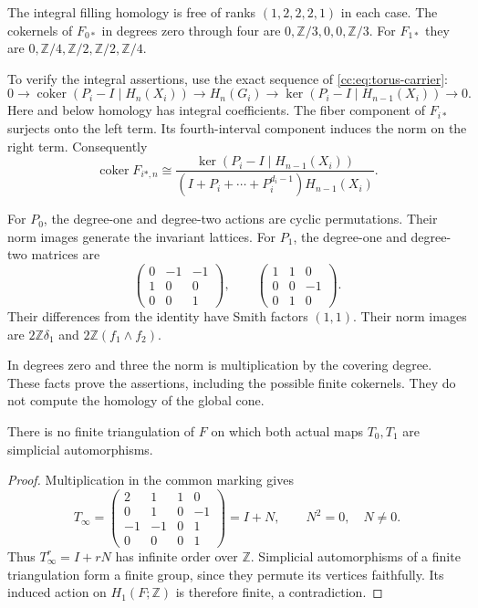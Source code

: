 The integral filling homology is free of ranks $(1,2,2,2,1)$ in each case.
The cokernels of $F_{0*}$ in degrees zero through four are
$0,\mathbb Z/3,0,0,\mathbb Z/3$.
For $F_{1*}$ they are
$0,\mathbb Z/4,\mathbb Z/2,\mathbb Z/2,\mathbb Z/4$.

To verify the integral assertions, use the exact sequence of
\eqref{cc:eq:torus-carrier}:
\[
0\longrightarrow\operatorname{coker}(P_i-I\mid H_n(X_i))
\longrightarrow H_n(G_i)
\longrightarrow\ker(P_i-I\mid H_{n-1}(X_i))\longrightarrow0.
\]
Here and below homology has integral coefficients.
The fiber component of $F_{i*}$ surjects onto the left term.
Its fourth-interval component induces the norm on the right term.
Consequently
\[
\operatorname{coker}F_{i*,n}
\cong
\frac{\ker(P_i-I\mid H_{n-1}(X_i))}
{(I+P_i+\cdots+P_i^{d_i-1})H_{n-1}(X_i)}.
\]

For $P_0$, the degree-one and degree-two actions are cyclic permutations.
Their norm images generate the invariant lattices.
For $P_1$, the degree-one and degree-two matrices are
\[
\begin{pmatrix}0&-1&-1\\1&0&0\\0&0&1\end{pmatrix},\qquad
\begin{pmatrix}1&1&0\\0&0&-1\\0&1&0\end{pmatrix}.
\]
Their differences from the identity have Smith factors $(1,1)$.
Their norm images are $2\mathbb Z\delta_1$ and
$2\mathbb Z(f_1\wedge f_2)$.

In degrees zero and three the norm is
multiplication by the covering degree. These facts prove the assertions,
including the possible finite cokernels. They do not compute the homology
of the global cone.

\begin{proposition}\label{cc:prop:no-common}
There is no finite triangulation of $F$ on which both actual maps
$T_0,T_1$ are simplicial automorphisms.
\end{proposition}

\begin{proof}
Multiplication in the common marking gives
\begin{equation}\label{cc:eq:cusp-monodromy}
T_\infty=\begin{pmatrix}2&1&1&0\\0&1&0&-1\\-1&-1&0&1\\0&0&0&1\end{pmatrix}
=I+N,\qquad N^2=0,\quad N\ne0.
\end{equation}
Thus $T_\infty^r=I+rN$ has infinite order over $\mathbb Z$.
Simplicial automorphisms of a finite triangulation form a finite group,
since they permute its vertices faithfully. Its induced action on
$H_1(F;\mathbb Z)$ is therefore finite, a contradiction.
\end{proof}


